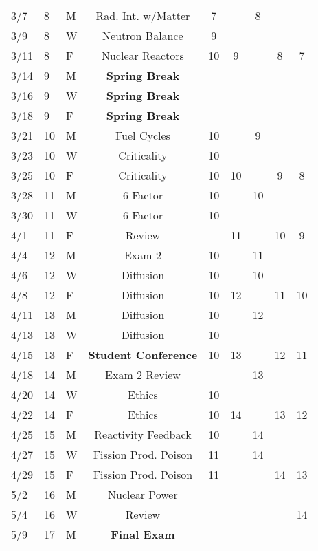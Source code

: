 \documentclass[11pt, a4paper]{article}
\begin{document}
\begin{table}[h]
\begin{center}
\begin{tabular}{lllcccccc}
3/7 & 8 & M & Rad. Int. w/Matter     & 7 &  & 8 &  &  \\
3/9 & 8 & W & Neutron Balance         & 9 &   &  &  &  \\
3/11 & 8 & F & Nuclear Reactors        & 10 & 9 &  & 8 & 7 \\
3/14 & 9 & M & \textbf{Spring Break}&  &  &  &  &  \\
3/16 & 9 & W & \textbf{Spring Break}&  &  &  &  &  \\
3/18 & 9 & F & \textbf{Spring Break}&  &  &  &  &  \\
3/21 & 10 & M & Fuel Cycles          & 10 &  & 9 &  &  \\
3/23 & 10 & W & Criticality          & 10 &  &  &  &  \\
3/25 & 10 & F & Criticality          & 10 & 10 &  & 9 & 8 \\
3/28 & 11 & M & 6 Factor            & 10 &  & 10 &  &  \\
3/30 & 11 & W & 6 Factor            & 10 &  &  &  & \\
4/1 & 11 & F & Review  &  &  11 &  & 10 & 9 \\
4/4 & 12 & M & Exam 2 &  10  &   & 11 &  &  \\
4/6 & 12 & W & Diffusion & 10  &  & 10 &  &  \\
4/8 & 12 & F & Diffusion & 10 & 12 &  & 11 & 10 \\
4/11 & 13 & M & Diffusion & 10 &  & 12 & &  \\
4/13 & 13 & W & Diffusion & 10 &  &  &  &  \\
4/15 & 13 & F & \textbf{Student Conference}    & 10 & 13 &  & 12 & 11 \\
4/18 & 14 & M & Exam 2 Review    &  &  & 13  &  &  \\
4/20 & 14 & W & Ethics     & 10 & &  &  & \\
4/22 & 14 & F & Ethics    & 10 & 14 &  & 13 & 12 \\
4/25 & 15 & M & Reactivity Feedback    & 10  &  & 14 & &  \\
4/27 & 15 & W & Fission Prod. Poison        & 11 &  & 14 &  &  \\
4/29 & 15 & F & Fission Prod. Poison        & 11 &  &  & 14 & 13 \\
5/2 & 16 & M & Nuclear Power                &  &  & &  &      \\
5/4 & 16 & W &  Review               &  &  &  &  &  14 \\
5/9 & 17 & M & \textbf{Final Exam}  &  &  &  &  &     \\
\end{tabular}
\end{center}
\end{table}
\FloatBarrier



\end{document}
